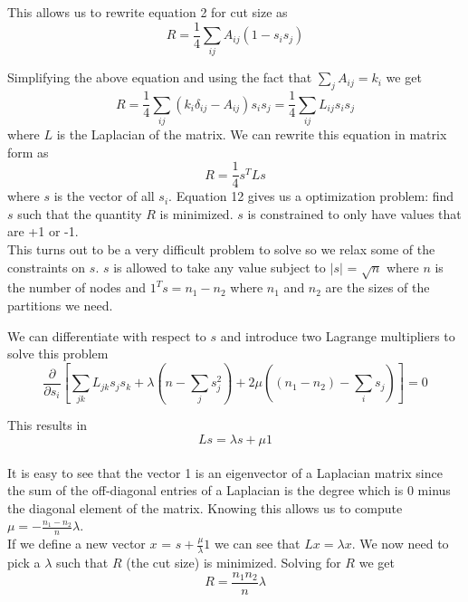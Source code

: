 \documentclass[12pt]{article}
\begin{document}
	This allows us to rewrite equation 2 for cut size as
	\begin{equation}
		R = \frac{1}{4} \sum_{ij} A_{ij} (1- s_i s_j)
	\end{equation}
	
	Simplifying the above equation and using the fact that $\sum_j A_{ij} = k_i$ we get
	\begin{equation}
		R = \frac{1}{4} \sum_{ij} (k_i \delta_{ij} - A_{ij}) s_i s_j = \frac{1}{4} \sum_{ij} L_{ij} s_i s_j
	\end{equation}
	where $L$ is the Laplacian of the matrix. We can rewrite this equation in matrix form as 
	\begin{equation}
		R = \frac{1}{4} s^T L s
	\end{equation}
	where $s$ is the vector of all $s_i$. Equation 12 gives us a optimization problem: find $s$ such that the quantity $R$ is minimized. $s$ is constrained to only have values that are +1 or -1. \\
	
	This turns out to be a very difficult problem to solve so we relax some of the constraints on $s$. $s$ is allowed to take any value subject to $|s|$ = $\sqrt{n}$ where $n$ is the number of nodes and $1^T s = n_1 - n_2 $ where $n_1$ and $n_2$ are the sizes of the partitions we need. 
	
	We can differentiate with respect to $s$ and introduce two Lagrange multipliers to solve this problem
	\begin{equation}
		\frac{\partial}{\partial s_i} 
			\left[ 
			\sum_{jk} L_{jk} s_j s_k 
			+ \lambda \left( n - \sum_j s_j^2 \right)
			+ 2 \mu \left( (n_1 - n_2) - \sum_i s_j \right)
			\right] = 0 
	\end{equation}
	
	This results in
	\begin{equation}
		L s = \lambda s + \mu 1 
	\end{equation} \\
	
	It is easy to see that the vector 1 is an eigenvector of a Laplacian matrix since the sum of the off-diagonal entries of a Laplacian is the degree which is 0 minus the diagonal element of the matrix. Knowing this allows us to compute $\mu = - \frac{n_1 - n_2}{n} \lambda$. \\
	
	If we define a new vector $x$ = $s + \frac{\mu}{\lambda} 1$ we can see that $L x = \lambda x$. We now need to pick a $\lambda$ such that $R$ (the cut size) is minimized. Solving for $R$ we get
	\begin{equation}
		R = \frac{n_1 n_2}{n} \lambda
	\end{equation}
	
\end{document}
